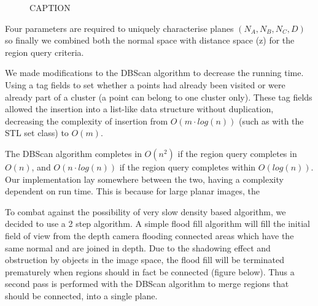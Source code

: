 \documentclass[]{article}
\begin{document}
{\begin{figure}[tbp]
	\centering     %

	\caption{CAPTION}
	\label{fig:spurious_plane_normals}
\end{figure}




Four parameters are required to uniquely characterise planes $(N_A, N_B, N_C, D)$ so finally we combined both the normal space with distance space (z) for the region query criteria.

We made modifications to the DBScan algorithm to decrease the running time. Using a tag fields to set whether a points had already been visited or were already part of a cluster (a point can belong to one cluster only). These tag fields allowed the insertion into a list-like data structure without duplication, decreasing the complexity of insertion from $O(m \cdot log(n))$ (such as with the STL set class) to $O(m)$.

The DBScan algorithm completes in $O(n^2)$ if the region query completes in $O(n)$, and $O(n \cdot log(n))$ if the region query completes within $O(log(n))$. Our implementation lay somewhere between the two, having a complexity dependent on run time. This is because for large planar images, the 


To combat against the possibility of very slow density based algorithm, we decided to use a 2 step algorithm. A simple flood fill algorithm will fill the initial field of view from the depth camera flooding connected areas which have the same normal and are joined in depth. Due to the shadowing effect and obstruction by objects in the image space, the flood fill will be terminated prematurely when regions should in fact be connected (figure below). Thus a second pass is performed with the DBScan algorithm to merge regions that should be connected, into a single plane. 

}
\end{document}

